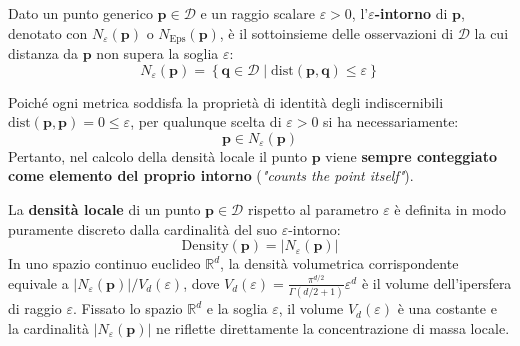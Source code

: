 \begin{definition}
Dato un punto generico $\mathbf{p} \in \mathcal{D}$ e un raggio scalare $\varepsilon > 0$, l'\textbf{$\varepsilon$-intorno} di $\mathbf{p}$, denotato con $N_\varepsilon(\mathbf{p})$ o $N_{\mathrm{Eps}}(\mathbf{p})$, è il sottoinsieme delle osservazioni di $\mathcal{D}$ la cui distanza da $\mathbf{p}$ non supera la soglia $\varepsilon$:
\begin{equation}
    N_\varepsilon(\mathbf{p}) = \left\{ \mathbf{q} \in \mathcal{D} \;\big|\; \mathrm{dist}(\mathbf{p}, \mathbf{q}) \le \varepsilon \right\}
    \label{eq:dm-eps-neighborhood}
\end{equation}
\end{definition}

\begin{remark}
Poiché ogni metrica soddisfa la proprietà di identità degli indiscernibili $\mathrm{dist}(\mathbf{p}, \mathbf{p}) = 0 \le \varepsilon$, per qualunque scelta di $\varepsilon > 0$ si ha necessariamente:
\begin{equation}
    \mathbf{p} \in N_\varepsilon(\mathbf{p})
\end{equation}
Pertanto, nel calcolo della densità locale il punto $\mathbf{p}$ viene \textbf{sempre conteggiato come elemento del proprio intorno} (\textit{"counts the point itself"}).
\end{remark}

\begin{definition}
La \textbf{densità locale} di un punto $\mathbf{p} \in \mathcal{D}$ rispetto al parametro $\varepsilon$ è definita in modo puramente discreto dalla cardinalità del suo $\varepsilon$-intorno:
\begin{equation}
    \mathrm{Density}(\mathbf{p}) = |N_\varepsilon(\mathbf{p})|
    \label{eq:dm-local-density}
\end{equation}
In uno spazio continuo euclideo $\mathbb{R}^d$, la densità volumetrica corrispondente equivale a $|N_\varepsilon(\mathbf{p})| / V_d(\varepsilon)$, dove $V_d(\varepsilon) = \frac{\pi^{d/2}}{\Gamma(d/2 + 1)} \varepsilon^d$ è il volume dell'ipersfera di raggio $\varepsilon$. Fissato lo spazio $\mathbb{R}^d$ e la soglia $\varepsilon$, il volume $V_d(\varepsilon)$ è una costante e la cardinalità $|N_\varepsilon(\mathbf{p})|$ ne riflette direttamente la concentrazione di massa locale.
\end{definition}

\FloatBarrier
